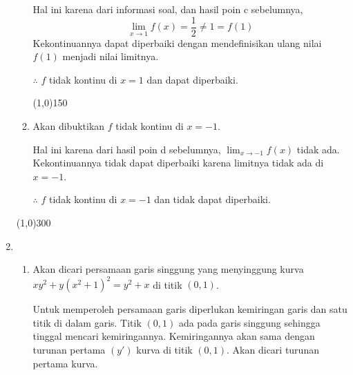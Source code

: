 \begin{enumerate}[leftmargin=*, label={\arabic*}.]
\begin{enumerate}[label={\alph*}.]
    Hal ini karena dari informasi soal, dan hasil poin c sebelumnya,
    \[
        \lim_{x\to 1} f(x) = \frac{1}{2} \neq 1 = f(1)
    \]
    Kekontinuannya dapat diperbaiki dengan mendefinisikan ulang nilai $f(1)$ 
    menjadi nilai limitnya.

    $\therefore$ $f$ tidak kontinu di $x=1$ dan dapat diperbaiki.


\begin{center}\line(1,0){150}\end{center} 


    \item Akan dibuktikan $f$ tidak kontinu di $x = -1$.
    
    Hal ini karena dari hasil poin d sebelumnya, $\lim_{x\to -1} f(x)$ 
    tidak ada.
    Kekontinuannya tidak dapat diperbaiki karena limitnya tidak ada di $x=-1$.

    $\therefore$ $f$ tidak kontinu di $x=-1$ dan tidak dapat diperbaiki.

    \end{enumerate}

\begin{center}\line(1,0){300}\end{center}


\item 
    \begin{enumerate}[label={\alph*}.]
    \item Akan dicari persamaan garis singgung yang menyinggung kurva \\
    $xy^{2}+y(x^{2}+1)^{2} = y^{2}+x$ di titik $(0,1)$.

    Untuk memperoleh persamaan garis diperlukan kemiringan garis dan satu titik
    di dalam garis. Titik $(0,1)$ ada pada garis singgung sehingga tinggal mencari 
    kemiringannya. Kemiringannya akan sama dengan turunan pertama $(y')$ kurva di titik 
    $(0,1)$. Akan dicari turunan pertama kurva.


\end{enumerate}
\end{enumerate}
